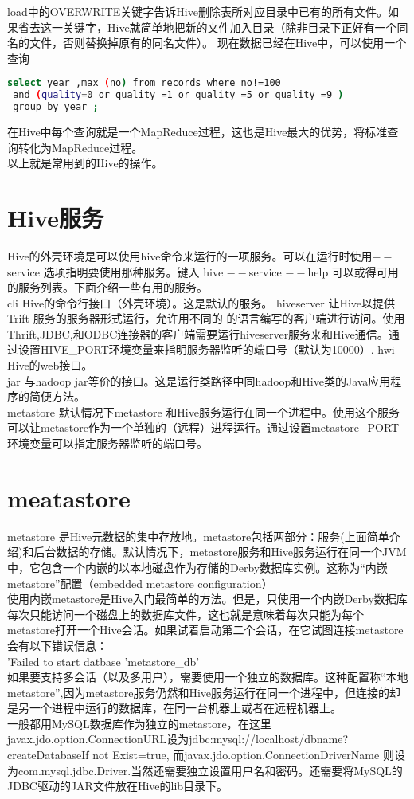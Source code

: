 \documentclass[12pt]{article}
\begin{document}
\begin{CJK*}{UTF8}{gbsn}
 load中的OVERWRITE关键字告诉Hive删除表所对应目录中已有的所有文件。如果省去这一关键字，Hive就简单地把新的文件加入目录（除非目录下正好有一个同名的文件，否则替换掉原有的同名文件）。
 现在数据已经在Hive中，可以使用一个查询
\begin{lstlisting}[language=sh]
 select year ,max (no) from records where no!=100 
 and (quality=0 or quality =1 or quality =5 or quality =9 )
 group by year ;    
\end{lstlisting}
 在Hive中每个查询就是一个MapReduce过程，这也是Hive最大的优势，将标准查询转化为MapReduce过程。\\
\indent 以上就是常用到的Hive的操作。
\section{Hive服务}
Hive的外壳环境是可以使用hive命令来运行的一项服务。可以在运行时使用$--$service 选项指明要使用那种服务。键入 hive $--$service $--$help 可以或得可用的服务列表。下面介绍一些有用的服务。\\
cli \quad Hive的命令行接口（外壳环境）。这是默认的服务。
hiveserver \quad 让Hive以提供Trift 服务的服务器形式运行，允许用不同的
的语言编写的客户端进行访问。使用Thrift,JDBC,和ODBC连接器的客户端需要运行hiveserver服务来和Hive通信。通过设置HIVE\_PORT环境变量来指明服务器监听的端口号（默认为10000）.
hwi \quad Hive的web接口。\\
jar \quad  与hadoop jar等价的接口。这是运行类路径中同hadoop和Hive类的Java应用程序的简便方法。\\
metastore \quad  默认情况下metastore 和Hive服务运行在同一个进程中。使用这个服务可以让metastore作为一个单独的（远程）进程运行。通过设置metastore\_PORT 环境变量可以指定服务器监听的端口号。 
\section{meatastore}
metastore 是Hive元数据的集中存放地。metastore包括两部分：服务(上面简单介绍)和后台数据的存储。默认情况下，metastore服务和Hive服务运行在同一个JVM中，它包含一个内嵌的以本地磁盘作为存储的Derby数据库实例。这称为“内嵌 metastore”配置（embedded metastore configuration）\\
使用内嵌metastore是Hive入门最简单的方法。但是，只使用一个内嵌Derby数据库每次只能访问一个磁盘上的数据库文件，这也就是意味着每次只能为每个metastore打开一个Hive会话。如果试着启动第二个会话，在它试图连接metastore 会有以下错误信息：\\
'Failed to start datbase 'metastore\_db' \\
如果要支持多会话（以及多用户），需要使用一个独立的数据库。这种配置称“本地metastore”,因为metastore服务仍然和Hive服务运行在同一个进程中，但连接的却是另一个进程中运行的数据库，在同一台机器上或者在远程机器上。\\
一般都用MySQL数据库作为独立的metastore，在这里javax.jdo.option.ConnectionURL设为jdbc:mysql://localhost/dbname?createDatabaseIf not Exist=true, 而javax.jdo.option.ConnectionDriverName 则设为com.mysql.jdbc.Driver.当然还需要独立设置用户名和密码。还需要将MySQL的
JDBC驱动的JAR文件放在Hive的lib目录下。

\end{CJK*}
\end{document}
